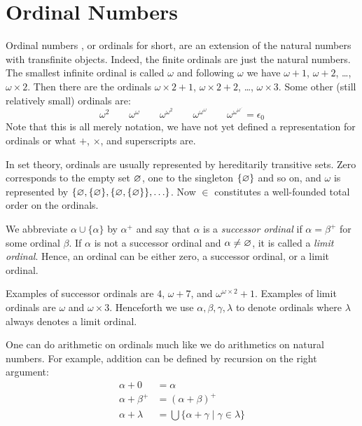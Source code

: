 

\section{Ordinal Numbers}\label{sec:ordinals}

Ordinal numbers \citep{cantor-15}, or ordinals for short, are an
extension of the natural numbers with transfinite objects. Indeed, the
finite ordinals are just the natural numbers. The smallest infinite
ordinal is called $\omega$ and following $\omega$ we have $\omega +
1$, $\omega + 2$, \ldots, $\omega \times 2$. Then there are the
ordinals $\omega \times 2 + 1$, $\omega \times 2 + 2$, \ldots, $\omega
\times 3$. Some other (still relatively small) ordinals are:
\begin{displaymath}
  \omega^2 \qquad
  \omega^\omega \qquad
  \omega^{\omega^2} \qquad
  \omega^{\omega^\omega} \qquad
  \omega^{\omega^{\omega^{\iddots}}} = \epsilon_0
\end{displaymath}
Note that this is all merely notation, we have not yet defined a
representation for ordinals or what $+$, $\times$, and superscripts
are.

In set theory, ordinals are usually represented by hereditarily transitive
sets. Zero corresponds to the empty set $\varnothing$, one to the
singleton $\{ \varnothing \}$ and so on, and $\omega$ is represented by
$\{ \varnothing, \{ \varnothing \}, \{ \varnothing, \{ \varnothing \} \} , \ldots
\}$. Now $\in$ constitutes a well-founded total order on the
ordinals.

We abbreviate $\alpha \cup \{ \alpha \}$ by $\alpha^+$ and say that
$\alpha$ is a \emph{successor ordinal} if $\alpha = \beta^+$ for some
ordinal $\beta$. If $\alpha$ is not a successor ordinal and $\alpha
\neq \varnothing$, it is called a \emph{limit ordinal}. Hence, an ordinal
can be either zero, a successor ordinal, or a limit ordinal.

Examples of successor ordinals are $4$, $\omega + 7$, and
$\omega^{\omega \times 2} + 1$. Examples of limit ordinals are
$\omega$ and $\omega \times 3$. Henceforth we use $\alpha, \beta,
\gamma, \lambda$ to denote ordinals where $\lambda$ always denotes a
limit ordinal.

One can do arithmetic on ordinals much like we do arithmetics on natural
numbers. For example, addition can be defined by recursion on the right
argument:
\begin{align*}
  \alpha + 0       &= \alpha\\
  \alpha + \beta^+ &= (\alpha + \beta)^+\\
  \alpha + \lambda &= \bigcup \{ \alpha + \gamma \; | \; \gamma \in \lambda \}
\end{align*}


